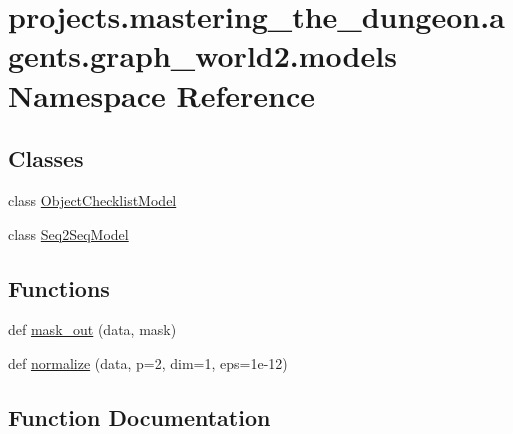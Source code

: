 \hypertarget{namespaceprojects_1_1mastering__the__dungeon_1_1agents_1_1graph__world2_1_1models}{}\section{projects.\+mastering\+\_\+the\+\_\+dungeon.\+agents.\+graph\+\_\+world2.\+models Namespace Reference}
\label{namespaceprojects_1_1mastering__the__dungeon_1_1agents_1_1graph__world2_1_1models}
\subsection*{Classes}
\begin{DoxyCompactItemize}
\item 
class \hyperlink{classprojects_1_1mastering__the__dungeon_1_1agents_1_1graph__world2_1_1models_1_1ObjectChecklistModel}{Object\+Checklist\+Model}
\item 
class \hyperlink{classprojects_1_1mastering__the__dungeon_1_1agents_1_1graph__world2_1_1models_1_1Seq2SeqModel}{Seq2\+Seq\+Model}
\end{DoxyCompactItemize}
\subsection*{Functions}
\begin{DoxyCompactItemize}
\item 
def \hyperlink{namespaceprojects_1_1mastering__the__dungeon_1_1agents_1_1graph__world2_1_1models_a7a25e3f344ab4c672afacbf512130890}{mask\+\_\+out} (data, mask)
\item 
def \hyperlink{namespaceprojects_1_1mastering__the__dungeon_1_1agents_1_1graph__world2_1_1models_a078f3c710f6afc6a50e933e55ed4259a}{normalize} (data, p=2, dim=1, eps=1e-\/12)
\end{DoxyCompactItemize}


\subsection{Function Documentation}
\mbox{\label{namespaceprojects_1_1mastering__the__dungeon_1_1agents_1_1graph__world2_1_1models_a7a25e3f344ab4c672afacbf512130890}} 
